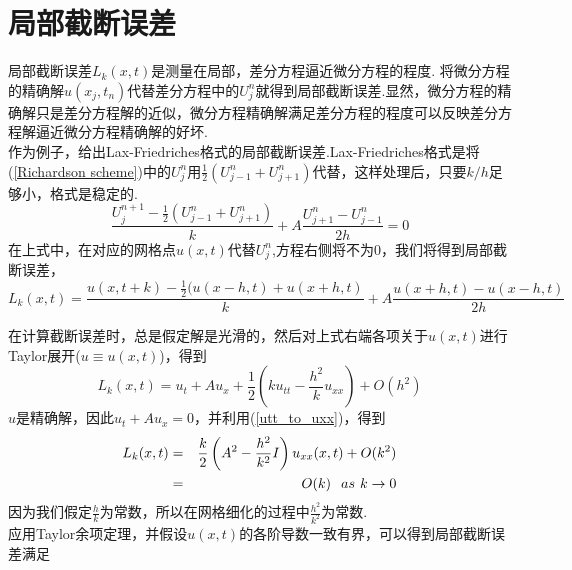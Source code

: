\section{局部截断误差}
局部截断误差$L_k(x,t)$是测量在局部，差分方程逼近微分方程的程度. 将微分方程的精确解$u(x_j,t_n)$代替差分方程中的$U_j^n$就得到局部截断误差.显然，微分方程的精确解只是差分方程解的近似，微分方程精确解满足差分方程的程度可以反映差分方程解逼近微分方程精确解的好坏.\\
作为例子，给出Lax-Friedriches格式的局部截断误差.Lax-Friedriches格式是将(\ref{Richardson scheme})中的$U_j^n$用$\frac{1}{2}(U_{j-1}^n+U_{j+1}^n)$代替，这样处理后，只要$k/h$足够小，格式是稳定的.
\begin{equation} \label{LF scheme}
\frac{U_{j}^{n+1} - \frac{1}{2}(U_{j-1}^n+U_{j+1}^n)}{k} + A\frac{U_{j+1}^{n} - U_{j-1}^{n}}{2h} = 0
\end{equation}
在上式中，在对应的网格点$u(x,t)$代替$U_j^n$,方程右侧将不为0，我们将得到局部截断误差，
\begin{equation} \label{LF scheme}
L_k(x,t) = \frac{u(x,t+k) - \frac{1}{2}(u(x-h,t)+u(x+h,t)}{k} + A\frac{u(x+h,t) - u(x-h,t)}{2h}
\end{equation}

在计算截断误差时，总是假定解是光滑的，然后对上式右端各项关于$u(x,t)$进行Taylor展开($u \equiv u(x,t)$)，得到
\begin{equation}
	L_k(x,t) = u_t + Au_x + \frac{1}{2}\left( ku_{tt} - \frac{h^2}{k}u_{xx}\right) + O(h^2)
\end{equation}
$u$是精确解，因此$u_t + Au_x=0$，并利用(\ref{utt_to_uxx})，得到
\begin{eqnarray}
	L_k(x,t) &=&\frac{k}{2}\left( A^2 - \frac{h^2}{k^2} I \right) u_{xx}(x,t) + O(k^2)  \nonumber \\
	&=& O(k) \hspace{0.1in} as \hspace{0.05in} k \to 0
\end{eqnarray}
因为我们假定$\frac{h}{k}$为常数，所以在网格细化的过程中$\frac{h^2}{k^2}$为常数. \\
应用Taylor余项定理，并假设$u(x,t)$的各阶导数一致有界，可以得到局部截断误差满足

